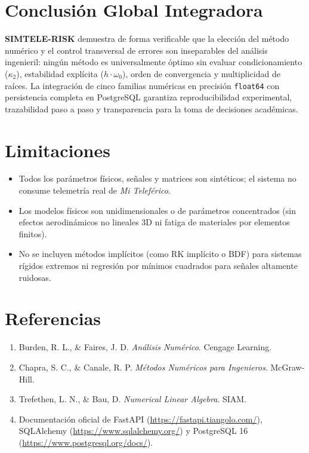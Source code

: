 \documentclass[11pt,a4paper]{article}
\begin{document}
\section{Conclusión Global Integradora}
\textbf{SIMTELE-RISK} demuestra de forma verificable que la elección del método numérico y el control transversal de errores son inseparables del análisis ingenieril: ningún método es universalmente óptimo sin evaluar condicionamiento ($\kappa_2$), estabilidad explícita ($h\cdot\omega_0$), orden de convergencia y multiplicidad de raíces. La integración de cinco familias numéricas en precisión \texttt{float64} con persistencia completa en PostgreSQL garantiza reproducibilidad experimental, trazabilidad paso a paso y transparencia para la toma de decisiones académicas.

\section{Limitaciones}
\begin{itemize}[noitemsep]
    \item Todos los parámetros físicos, señales y matrices son sintéticos; el sistema no consume telemetría real de \textit{Mi Teleférico}.
    \item Los modelos físicos son unidimensionales o de parámetros concentrados (sin efectos aerodinámicos no lineales 3D ni fatiga de materiales por elementos finitos).
    \item No se incluyen métodos implícitos (como RK implícito o BDF) para sistemas rígidos extremos ni regresión por mínimos cuadrados para señales altamente ruidosas.
\end{itemize}

\section{Referencias}
\begin{enumerate}[noitemsep]
    \item Burden, R. L., \& Faires, J. D. \textit{Análisis Numérico}. Cengage Learning.
    \item Chapra, S. C., \& Canale, R. P. \textit{Métodos Numéricos para Ingenieros}. McGraw-Hill.
    \item Trefethen, L. N., \& Bau, D. \textit{Numerical Linear Algebra}. SIAM.
    \item Documentación oficial de FastAPI (\url{https://fastapi.tiangolo.com/}), SQLAlchemy (\url{https://www.sqlalchemy.org/}) y PostgreSQL 16 (\url{https://www.postgresql.org/docs/}).
\end{enumerate}
\end{document}
